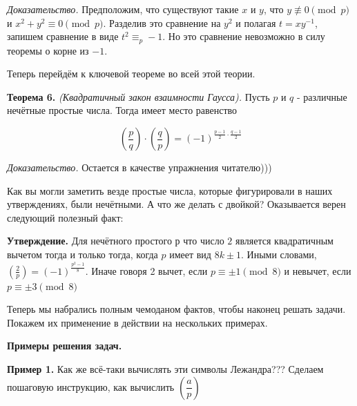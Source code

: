 \textit{Доказательство.} Предположим, что существуют такие $x$ и $y$, что $y \not \equiv 0 \pmod{p}$ и $x^2+y^2 \equiv 0 \pmod{p}$. Разделив это сравнение на $y^2$ и полагая $t=x y^{-1}$, запишем сравнение в виде $t^2 \equiv_p-1$. Но это сравнение невозможно в силу теоремы о корне из $-1$.

Теперь перейдём к ключевой теореме во всей этой теории. 

\textbf{Теорема 6.}
\textit{(Квадратичный закон взаимности Гаусса).}
Пусть $p$ и $q$ - различные нечётные простые числа. Тогда имеет место равенство

$$
\left(\frac{p}{q}\right) \cdot\left(\frac{q}{p}\right)=(-1)^{\frac{p-1}{2} \cdot \frac{q-1}{2}}
$$

\textit{Доказательство.} Остается в качестве упражнения читателю)))

Как вы могли заметить везде простые числа, которые фигурировали в наших утверждениях, были нечётными. А что же делать с двойкой? Оказывается верен следующий полезный факт:

\textbf{Утверждение.}
Для нечётного простого $р$ что число $2$ является квадратичным вычетом тогда и только тогда, когда $p$ имеет вид $8 k \pm 1$. Иными словами, $\left(\frac{2}{p}\right)=(-1)^{\frac{p^2-1}{8}}$. Иначе говоря 2 вычет, если $p \equiv \pm1 \pmod{8}$ и невычет, если $p \equiv \pm 3 \pmod{8}$


Теперь мы набрались полным чемоданом фактов, чтобы наконец решать задачи. Покажем их применение в действии на нескольких примерах.


\newpage

\hspace{3mm}

\centerline{\bf \Huge Примеры решения задач.}

\textbf{Пример 1.} Как же всё-таки вычислять эти символы Лежандра??? Сделаем пошаговую инструкцию, как вычислить $\left(\dfrac{a}{p}\right)$


